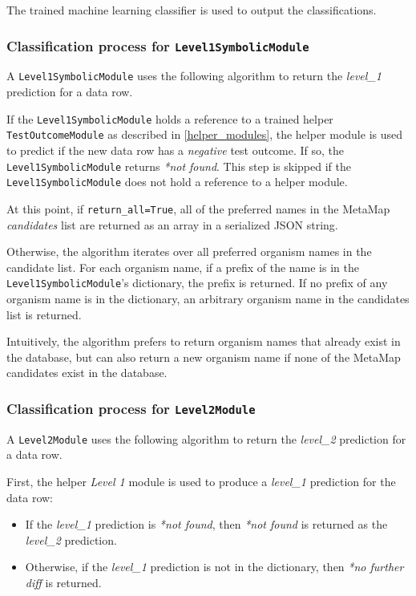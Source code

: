 \documentclass[a4paper]{article}
\begin{document}
The trained machine learning classifier is used to output the classifications.

\subsubsection{Classification process for \lstinline{Level1SymbolicModule}}

A \lstinline{Level1SymbolicModule} uses the following algorithm to return the \textit{level\_1} prediction for a data row.

If the \lstinline{Level1SymbolicModule} holds a reference to a trained helper \lstinline{TestOutcomeModule} as described in \ref{helper_modules}, the helper module is used to predict if the new data row has a \textit{negative} test outcome. If so, the \lstinline{Level1SymbolicModule} returns \textit{*not found}. This step is skipped if the \lstinline{Level1SymbolicModule} does not hold a reference to a helper module.

At this point, if \lstinline{return_all=True}, all of the preferred names in the MetaMap \textit{candidates} list are returned as an array in a serialized JSON string.

Otherwise, the algorithm iterates over all preferred organism names in the candidate list. For each organism name, if a prefix of the name is in the \lstinline{Level1SymbolicModule}'s dictionary, the prefix is returned. If no prefix of any organism name is in the dictionary, an arbitrary organism name in the candidates list is returned.

Intuitively, the algorithm prefers to return organism names that already exist in the database, but can also return a new organism name if none of the MetaMap candidates exist in the database.

\subsubsection{Classification process for \lstinline{Level2Module}}

A \lstinline{Level2Module} uses the following algorithm to return the \textit{level\_2} prediction for a data row.

First, the helper \textit{Level 1} module is used to produce a \textit{level\_1} prediction for the data row:

\begin{itemize}
\item If the \textit{level\_1} prediction is \textit{*not found}, then \textit{*not found} is returned as the \textit{level\_2} prediction.
\item Otherwise, if the \textit{level\_1} prediction is not in the dictionary, then \textit{*no further diff} is returned.
\end{itemize}
\end{document}
